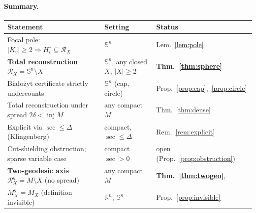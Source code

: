 \documentclass[11pt]{article}
\theoremstyle{remark}
\newcommand{\R}{\mathbb{R}}
\newcommand{\X}{X}
\newcommand{\Mx}{M_{\X}}
\newcommand{\Rx}{\mathcal{R}_{\X}}
\newcommand{\inj}{\operatorname{inj}}
\newcommand{\Sn}{\mathbb{S}^{n}}
\begin{document}
\paragraph{Summary.}
\begin{center}
\begin{tabular}{lll}
\toprule
Statement & Setting & Status\\
\midrule
Focal pole: $|K_{v}|\ge2\Rightarrow H_{v}^{\circ}\subseteq\Rx$
  & $\Sn$ & Lem.~\ref{lem:pole}\\
\textbf{Total reconstruction} $\Rx=\Sn\setminus\X$
  & $\Sn$, any closed $\X$, $|\X|\ge2$ & \textbf{Thm.~\ref{thm:sphere}}\\
Bia\l{}o\.zyt certificate strictly undercounts
  & $\Sn$ (cap, circle) & Prop.~\ref{prop:cap},~\ref{prop:circle}\\
Total reconstruction under spread $2\delta<\inj M$
  & any compact $M$ & Thm.~\ref{thm:dense}\\
Explicit via $\sec\le\Delta$ (Klingenberg)
  & compact, $\sec\le\Delta$ & Rem.~\ref{rem:explicit}\\
Cut-shielding obstruction; sparse variable case
  & compact $\sec>0$ & open (Prop.~\ref{prop:obstruction})\\
\textbf{Two-geodesic axis} $\Rx^{g}=M\setminus\X$ (no spread)
  & any compact $M$ & \textbf{Thm.~\ref{thm:twogeo}}, \cite{C}\\
\quad $\Mx^{g}=\Mx$ (definition invisible)
  & $\R^{n}$, $\Sn$ & Prop.~\ref{prop:invisible}\\
\bottomrule
\end{tabular}
\end{center}
\end{document}

